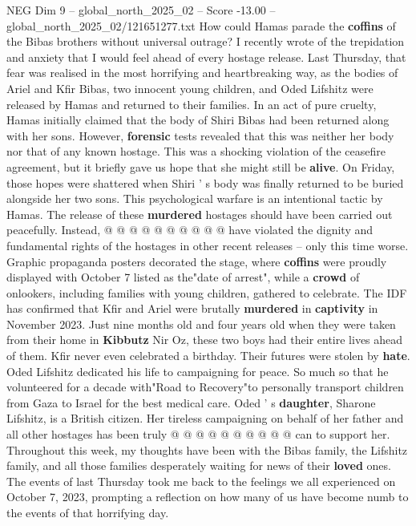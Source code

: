 \begin{textsample}{NEG Dim 9 – global\_north\_2025\_02 – Score -13.00 – global\_north\_2025\_02/121651277.txt}  \label{ex:f9_neg_051}
How could Hamas parade the \textbf{coffins} of the Bibas brothers without universal outrage?
I recently wrote of the trepidation and anxiety that I would feel ahead of every hostage release.
Last Thursday, that fear was realised in the most horrifying and heartbreaking way, as the bodies of Ariel and Kfir Bibas, two innocent young children, and Oded Lifshitz were released by Hamas and returned to their families.
In an act of pure cruelty, Hamas initially claimed that the body of Shiri Bibas had been returned along with her sons.
However, \textbf{forensic} tests revealed that this was neither her body nor that of any known hostage.
This was a shocking violation of the ceasefire agreement, but it briefly gave us hope that she might still be \textbf{alive}.
On Friday, those hopes were shattered when Shiri ' s body was finally returned to be buried alongside her two sons.
This psychological warfare is an intentional tactic by Hamas.
The release of these \textbf{murdered} hostages should have been carried out peacefully.
Instead, @ @ @ @ @ @ @ @ @ @ have violated the dignity and fundamental rights of the hostages in other recent releases -- only this time worse.
Graphic propaganda posters decorated the stage, where \textbf{coffins} were proudly displayed with October 7 listed as the"date of arrest", while a \textbf{crowd} of onlookers, including families with young children, gathered to celebrate.
The IDF has confirmed that Kfir and Ariel were brutally \textbf{murdered} in \textbf{captivity} in November 2023.
Just nine months old and four years old when they were taken from their home in \textbf{Kibbutz} Nir Oz, these two boys had their entire lives ahead of them.
Kfir never even celebrated a birthday.
Their futures were stolen by \textbf{hate}.
Oded Lifshitz dedicated his life to campaigning for peace.
So much so that he volunteered for a decade with"Road to Recovery"to personally transport children from Gaza to Israel for the best medical care.
Oded ' s \textbf{daughter}, Sharone Lifshitz, is a British citizen.
Her tireless campaigning on behalf of her father and all other hostages has been truly @ @ @ @ @ @ @ @ @ @ can to support her.
Throughout this week, my thoughts have been with the Bibas family, the Lifshitz family, and all those families desperately waiting for news of their \textbf{loved} ones.
The events of last Thursday took me back to the feelings we all experienced on October 7, 2023, prompting a reflection on how many of us have become numb to the events of that horrifying day.

\end{textsample}
